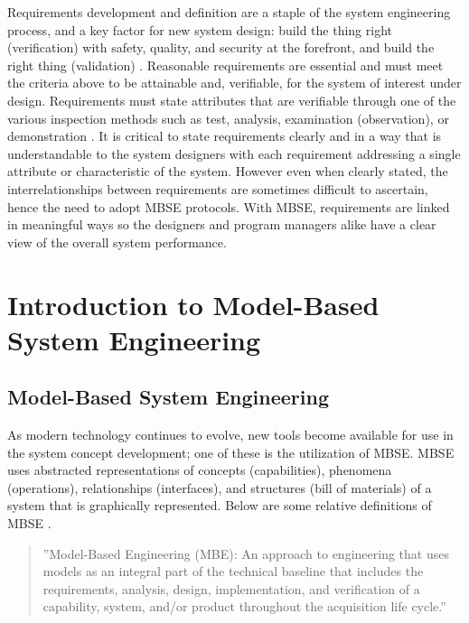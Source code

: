 \documentclass[num-refs]{wiley-article}
\begin{document}
Requirements development and definition are a staple of the system engineering process, and a key factor for new system design: build the thing right (verification) with safety, quality, and security at the forefront, and build the right thing (validation) \cite{NASAHandbook2016}. Reasonable requirements are essential and must meet the criteria above to be attainable and, verifiable, for the system of interest under design. Requirements must state attributes that are verifiable through one of the various inspection methods such as test, analysis, examination (observation), or demonstration \cite{Pesler2011}. It is critical to state requirements clearly and in a way that is understandable to the system designers with each requirement addressing a single attribute or characteristic of the system. However even when clearly stated, the interrelationships between requirements are sometimes difficult to ascertain, hence the need to adopt MBSE protocols. With MBSE, requirements are linked in meaningful ways so the designers and program managers alike have a clear view of the overall system performance.

\section{Introduction to Model-Based System Engineering}
\label{Introduction to Model-Based System Engineering}

\subsection{Model-Based System Engineering}
\label{Model-Based System Engineering}

As modern technology continues to evolve, new tools become available for use in the system concept development; one of these is the utilization of MBSE. MBSE uses abstracted representations of concepts (capabilities), phenomena (operations), relationships (interfaces), and structures (bill of materials) of a system that is graphically represented. Below are some relative definitions of MBSE \cite{Friedenthal2008}.

\begin{quote}
''Model-Based Engineering (MBE): An approach to engineering that uses models as an integral part of the technical baseline that includes the requirements, analysis, design, implementation, and verification of a capability, system, and/or product throughout the acquisition life cycle.'' \cite{Bergenthal2011}
\end{quote}
\end{document}
